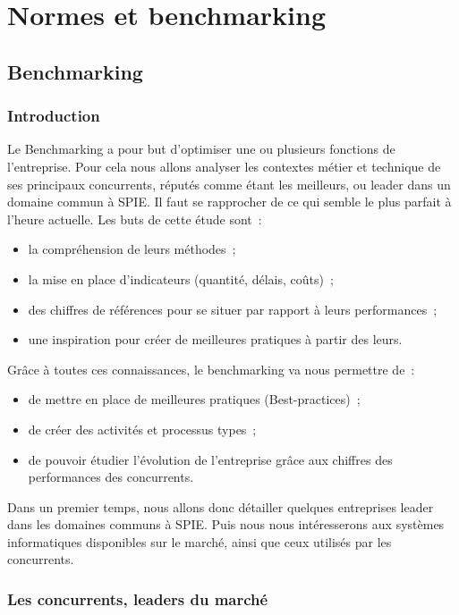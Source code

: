 \chapter{Normes et benchmarking}
\section{Benchmarking}
\subsection{Introduction}
	Le Benchmarking a pour but d'optimiser une ou plusieurs fonctions de l'entreprise. Pour cela nous allons analyser les contextes métier et technique de ses principaux concurrents, réputés comme étant les meilleurs, ou leader dans un domaine commun à SPIE. Il faut se rapprocher de ce qui semble le plus parfait à l'heure actuelle.
	Les buts de cette étude sont~:
\begin{itemize}
	\item la compréhension de leurs méthodes~;
	\item la mise en place d'indicateurs (quantité, délais, coûts)~;
	\item des chiffres de références pour se situer par rapport à leurs performances~;
	\item une inspiration pour créer de meilleures pratiques à partir des leurs.
\end{itemize}
\bigbreak
	Grâce à toutes ces connaissances, le benchmarking va nous permettre de~:
\begin{itemize}
	\item de mettre en place de meilleures pratiques (Best-practices)~;
	\item de créer des activités et processus types~;
	\item de pouvoir étudier l'évolution de l'entreprise grâce aux chiffres des performances des concurrents.
\end{itemize}
\bigbreak
	Dans un premier temps, nous allons donc détailler quelques entreprises leader dans les domaines communs à SPIE. Puis nous nous intéresserons aux systèmes informatiques disponibles sur le marché, ainsi que ceux utilisés par les concurrents.

\subsection{Les concurrents, leaders du marché}
